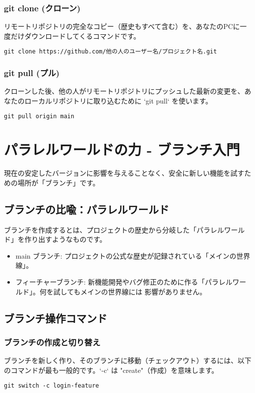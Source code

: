 \documentclass{ltjsarticle}
\begin{document}
\subsubsection{git clone (クローン)}
リモートリポジトリの完全なコピー（歴史もすべて含む）を、あなたのPCに一度だけダウンロードしてくるコマンドです。
\begin{verbatim}
git clone https://github.com/他の人のユーザー名/プロジェクト名.git
\end{verbatim}

\subsubsection{git pull (プル)}
クローンした後、他の人がリモートリポジトリにプッシュした最新の変更を、あなたのローカルリポジトリに取り込むために
 `git pull` を使います。
\begin{verbatim}
git pull origin main
\end{verbatim}

\section{パラレルワールドの力 - ブランチ入門}
現在の安定したバージョンに影響を与えることなく、安全に新しい機能を試すための場所が「ブランチ」です。

\subsection{ブランチの比喩：パラレルワールド}
ブランチを作成するとは、プロジェクトの歴史から分岐した「パラレルワールド」を作り出すようなものです。
\begin{itemize}
    \item main ブランチ: プロジェクトの公式な歴史が記録されている「メインの世界線」。
    \item フィーチャーブランチ: 新機能開発やバグ修正のために作る「パラレルワールド」。何を試してもメインの世界線には
		影響がありません。
\end{itemize}

\subsection{ブランチ操作コマンド}
\subsubsection{ブランチの作成と切り替え}
ブランチを新しく作り、そのブランチに移動（チェックアウト）するには、以下のコマンドが最も一般的です。`-c` は
 "create"（作成）を意味します。
\begin{verbatim}
git switch -c login-feature
\end{verbatim}
\end{document}
